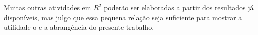 \documentclass[12pt,a4paper]{book}
\begin{document}
Muitas outras atividades em $R^2$ poder\~ao ser elaboradas a partir dos resultados j\'a dispon\'iveis, mas julgo que essa pequena rela\c{c}\~ao seja suficiente para mostrar a utilidade o e a abrang\^encia do presente trabalho. 


\cleardoublepage
\appendix

\fancyhead{}   %
\fancyhead[EC]{}
\fancyhead[ER]{\sc \leftmark}
\fancyhead[OL]{\sc \leftmark}
\fancyhead[OC]{}

%
%

\cleardoublepage

\fancyhead{}   %
\fancyhead[EL]{}
\fancyhead[EC]{}
\fancyhead[ER]{\sc \leftmark}
\fancyhead[OL]{\sc \leftmark}
\fancyhead[OC]{}
\fancyhead[OR]{}


\newpage \label{pagbib}

\end{document}
